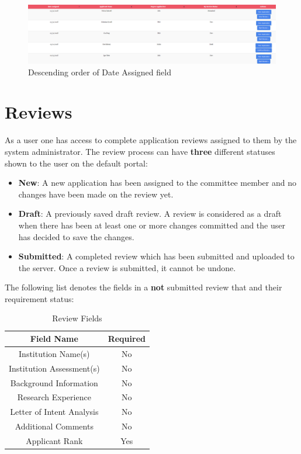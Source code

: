 \documentclass[fontsize=12pt,paper=letter,twoside]{scrartcl}
\begin{document}
\begin{figure}[!htb]
\begin{center}
\includegraphics[width=.9\textwidth]{images/order_descending.png}
\end{center}
\caption{Descending order of Date Assigned field}
\label{fig:order_descending}
\end{figure}

\newpage
\section{Reviews} \label{sec:reviews}
As a user one has access to complete application reviews assigned to them by the system administrator. The review process can have \textbf{three} different statuses shown to the user on the default portal:
\begin{itemize}
\item \textbf{New}: A new application has been assigned to the committee member and no changes have been made on the review yet.
\item \textbf{Draft}: A previously saved draft review. A review is considered as a draft when there has been at least one or more changes committed and the user has decided to save the changes.
\item \textbf{Submitted}: A completed review which has been submitted and uploaded to the server. Once a review is submitted, it cannot be undone.
\end{itemize}

\bigskip
\noindent The following list denotes the fields in a \textbf{not} submitted review that and their requirement status:
\begin{table}[h]
\centering
\begin{tabular}{|c | c |}
	\cline{1-2}
	\textbf{Field Name} & \textbf{Required}\\ \hline
	Institution Name(s) & No \\ \hline
	Institution Assessment(s) & No \\ \hline
	Background Information & No \\ \hline
	Research Experience & No \\ \hline
	Letter of Intent Analysis & No \\ \hline
	Additional Comments & No \\ \hline
	Applicant Rank & Yes \\ \hline
\end{tabular}
\caption {Review Fields}
\label{tbl:review_fields}
\end{table}
\end{document}

